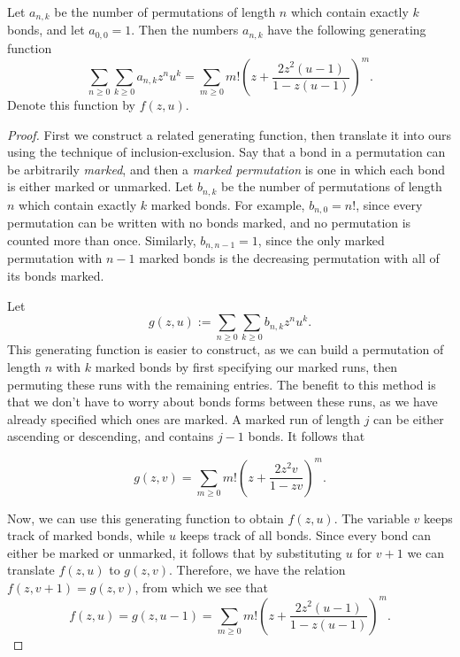   \begin{theorem} \label{fixpat:thm:genfcn}
    Let $a_{n,k}$ be the number of permutations of length $n$ which contain
    exactly $k$ bonds, and let $a_{0,0} = 1$. Then the numbers $a_{n,k}$ have
    the following generating function
    $$ \sum_{n \geq 0} \sum_{k \geq 0} a_{n,k} z^n u^k = 
      \sum_{m \geq 0} m! \left(z + \frac{2z^2(u - 1)}{1 - z(u-1)}\right)^m.$$
    Denote this function by $f(z,u)$. 
  \end{theorem}
  \begin{proof}
    First we construct a related generating function, then translate it into
    ours using the technique of inclusion-exclusion. 
    Say that a bond in a permutation can be arbitrarily \emph{marked}, and then a  
    \emph{marked permutation} is one in which each bond is either marked or
    unmarked.  Let $b_{n,k}$ be the number of permutations of length $n$ which contain
    exactly $k$ marked bonds. For example, $b_{n,0} = n!$, since every
    permutation can be written with no bonds marked, and no permutation is
    counted more than once. Similarly, $b_{n,n-1} = 1$, since the only
    marked permutation with $n-1$ marked bonds is the decreasing permutation
    with all of its bonds marked. 

    Let 
    $$ g(z,u) := \sum_{n \geq 0}\sum_{k \geq 0} b_{n,k}z^n u^k. $$ 
    This generating
    function is easier to construct, as we can build a permutation of length $n$ with
    $k$ marked bonds by first specifying our marked runs, then permuting
    these runs with the remaining entries. The benefit to this method is that
    we don't have to worry about bonds forms between these runs, as we have
    already specified which ones are marked. A marked run of length $j$
    can be either ascending or descending, and contains $j-1$ bonds. 
    It follows that 

    $$ g(z,v) = \sum_{m \geq 0}
        m! \left(z + \frac{2z^2v}{1 - zv} \right)^m.$$

    Now, we can use this generating function to obtain $f(z,u)$. The variable
    $v$ keeps track of marked bonds, while $u$ keeps track of all bonds.
    Since every bond can either be marked or unmarked, it follows that by
    substituting $u$ for $v + 1$ we can translate $f(z,u)$ to $g(z,v)$.
    Therefore, we have the relation $f(z,v+1) = g(z,v)$, from which we see
    that 
    $$ f(z,u) = g(z,u-1) = 
      \sum_{m \geq 0} m! \left(z + \frac{2z^2(u-1)}{1 - z(u-1)} \right)^m.$$
  \end{proof}

